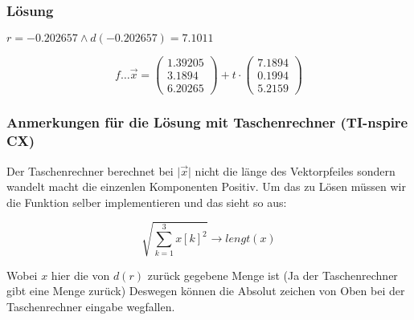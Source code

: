 \documentclass{article}
\begin{document}
\subsubsection*{ Lösung }

\( r = -0.202657  \land d(-0.202657) = 7.1011 \) 

\begin{equation}
	f \dots \overrightarrow{x} = \begin{pmatrix}1.39205\\3.1894\\6.20265\end{pmatrix} + t \cdot \begin{pmatrix}7.1894\\0.1994\\5.2159\end{pmatrix}
\end{equation}

\subsubsection*{ Anmerkungen für die Lösung mit Taschenrechner (TI-nspire CX) }


Der Taschenrechner berechnet bei \( \vert \overrightarrow{x} \vert \) nicht die länge des Vektorpfeiles sondern wandelt macht die einzenlen Komponenten Positiv. Um das zu Lösen müssen wir die Funktion selber implementieren und das sieht so aus:

\begin{equation}
	\sqrt{\sum_{k=1}^3 x[k]^2} \rightarrow lengt(x)
\end{equation}

Wobei \( x \) hier die von \(d(r) \) zurück gegebene Menge ist (Ja der Taschenrechner gibt eine Menge zurück) Deswegen können die Absolut zeichen von Oben bei der Taschenrechner eingabe wegfallen.
\end{document}
